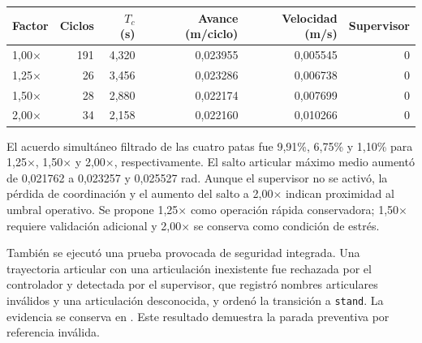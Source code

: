 \begin{center}
\begin{tabular}{lrrrrr}
Factor & Ciclos & $T_c$ (s) & Avance (m/ciclo) & Velocidad (m/s) & Supervisor \\
\hline
1,00$\times$ & 191 & 4,320 & 0,023955 & 0,005545 & 0 \\
1,25$\times$ & 26 & 3,456 & 0,023286 & 0,006738 & 0 \\
1,50$\times$ & 28 & 2,880 & 0,022174 & 0,007699 & 0 \\
2,00$\times$ & 34 & 2,158 & 0,022160 & 0,010266 & 0 \\
\end{tabular}
\end{center}

El acuerdo simultáneo filtrado de las cuatro patas fue 9,91\%, 6,75\% y
1,10\% para 1,25$\times$, 1,50$\times$ y 2,00$\times$, respectivamente. El
salto articular máximo medio aumentó de 0,021762 a 0,023257 y 0,025527 rad.
Aunque el supervisor no se activó, la pérdida de coordinación y el aumento del
salto a 2,00$\times$ indican proximidad al umbral operativo. Se propone
1,25$\times$ como operación rápida conservadora; 1,50$\times$ requiere
validación adicional y 2,00$\times$ se conserva como condición de estrés.

También se ejecutó una prueba provocada de seguridad integrada. Una trayectoria
articular con una articulación inexistente fue rechazada por el
controlador y detectada por el supervisor, que registró nombres articulares
inválidos y una articulación desconocida, y ordenó la transición a
\texttt{stand}. La evidencia se conserva en
. Este resultado
demuestra la parada preventiva por referencia inválida.

